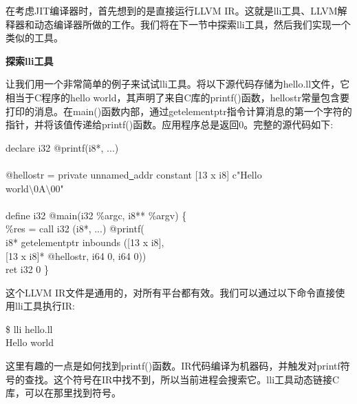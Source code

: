 
在考虑JIT编译器时，首先想到的是直接运行LLVM IR。这就是lli工具、LLVM解释器和动态编译器所做的工作。我们将在下一节中探索lli工具，然后我们实现一个类似的工具。\par

\hspace*{\fill} \par %
\textbf{探索lli工具}

让我们用一个非常简单的例子来试试lli工具。将以下源代码存储为hello.ll文件，它相当于C程序的hello world，其声明了来自C库的printf()函数，hellostr常量包含要打印的消息。在main()函数内部，通过getelementptr指令计算消息的第一个字符的指针，并将该值传递给printf()函数。应用程序总是返回0。完整的源代码如下:\par

\begin{tcolorbox}[colback=white,colframe=black]
declare i32 @printf(i8*, ...) \\
\\
@hellostr = private unnamed\underline{~}addr constant [13 x i8] c"Hello  \\
\hspace*{8cm}world$\setminus$0A$\setminus$00" \\
\\
define i32 @main(i32 \%argc, i8** \%argv) \{ \\
\hspace*{0.5cm}\%res = call i32 (i8*, ...) @printf( \\
\hspace*{3.5cm}i8* getelementptr inbounds ([13 x i8], \\
\hspace*{4.5cm}[13 x i8]* @hellostr, i64 0, i64 0)) \\
\hspace*{0.5cm}ret i32 0
\}
\end{tcolorbox}

这个LLVM IR文件是通用的，对所有平台都有效。我们可以通过以下命令直接使用lli工具执行IR:\par

\begin{tcolorbox}[colback=white,colframe=black]
\$ lli hello.ll \\
Hello world
\end{tcolorbox}

这里有趣的一点是如何找到printf()函数。IR代码编译为机器码，并触发对printf符号的查找。这个符号在IR中找不到，所以当前进程会搜索它。lli工具动态链接C库，可以在那里找到符号。\par

